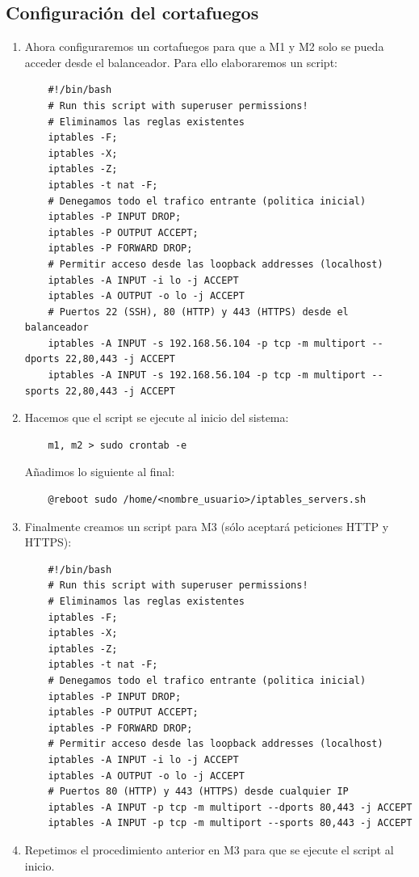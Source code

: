 \documentclass[12pt,spanish]{article}
\begin{document}
\subsection{Configuración del cortafuegos}
	\begin{enumerate}
	\item Ahora configuraremos un cortafuegos para que a M1 y M2 solo se pueda acceder desde el balanceador. Para ello elaboraremos un script:
	\begin{lstlisting}
	#!/bin/bash
	# Run this script with superuser permissions!
	# Eliminamos las reglas existentes
	iptables -F;
	iptables -X;
	iptables -Z;
	iptables -t nat -F;
	# Denegamos todo el trafico entrante (politica inicial)
	iptables -P INPUT DROP;
	iptables -P OUTPUT ACCEPT;
	iptables -P FORWARD DROP;
	# Permitir acceso desde las loopback addresses (localhost)
	iptables -A INPUT -i lo -j ACCEPT
	iptables -A OUTPUT -o lo -j ACCEPT
	# Puertos 22 (SSH), 80 (HTTP) y 443 (HTTPS) desde el balanceador
	iptables -A INPUT -s 192.168.56.104 -p tcp -m multiport --dports 22,80,443 -j ACCEPT
	iptables -A INPUT -s 192.168.56.104 -p tcp -m multiport --sports 22,80,443 -j ACCEPT
	\end{lstlisting}
	\item Hacemos que el script se ejecute al inicio del sistema:
	\begin{lstlisting}
	m1, m2 > sudo crontab -e
	\end{lstlisting}
	Añadimos lo siguiente al final:
	\begin{lstlisting}
	@reboot sudo /home/<nombre_usuario>/iptables_servers.sh
	\end{lstlisting}
	\item Finalmente creamos un script para M3 (sólo aceptará peticiones HTTP y HTTPS):
	\begin{lstlisting}
	#!/bin/bash
	# Run this script with superuser permissions!
	# Eliminamos las reglas existentes
	iptables -F;
	iptables -X;
	iptables -Z;
	iptables -t nat -F;
	# Denegamos todo el trafico entrante (politica inicial)
	iptables -P INPUT DROP;
	iptables -P OUTPUT ACCEPT;
	iptables -P FORWARD DROP;
	# Permitir acceso desde las loopback addresses (localhost)
	iptables -A INPUT -i lo -j ACCEPT
	iptables -A OUTPUT -o lo -j ACCEPT
	# Puertos 80 (HTTP) y 443 (HTTPS) desde cualquier IP
	iptables -A INPUT -p tcp -m multiport --dports 80,443 -j ACCEPT
	iptables -A INPUT -p tcp -m multiport --sports 80,443 -j ACCEPT
	\end{lstlisting}
	\item Repetimos el procedimiento anterior en M3 para que se ejecute el script al inicio.
\end{enumerate}
\newpage
\end{document}
